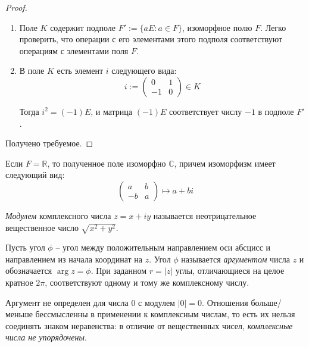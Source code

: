 \begin{proof}
\begin{enumerate}
    		\item Поле $K$ содержит подполе $F' := \{aE: a \in F\}$, изоморфное полю $F$. Легко проверить, что операции с его элементами этого подполя соответствуют операциям с элементами поля $F$.
    		
    		\item В поле $K$ есть элемент $i$ следующего вида:
    		\[i := \begin{pmatrix}
    		0 & 1\\
    		-1 & 0
    		\end{pmatrix} \in K\]
    		
    		Тогда $i^2 = (-1)E$, и матрица $(-1)E$ соответствует числу $-1$ в подполе $F'$.
    	\end{enumerate}
    	
    	Получено требуемое.
    \end{proof}
    
    \begin{corollary}
    	Если $F = \mathbb{R}$, то полученное поле изоморфно $\mathbb{C}$, причем изоморфизм имеет следующий вид:
    	\[\begin{pmatrix}
    	a & b\\
    	-b & a
    	\end{pmatrix} \mapsto a +bi\]
    \end{corollary}

    \begin{definition}
        \textit{Модулем} комплексного числа $z = x + iy$ называется неотрицательное вещественное число $\sqrt{x^2 + y^2}$.
    \end{definition}

    \begin{definition}
        Пусть угол $\phi$ -- угол между положительным направлением оси абсцисс и направлением из начала координат на $z$. Угол $\phi$ называется \textit{аргументом} числа $z$ и обозначается $\arg z = \phi$. При заданном $r = |z|$ углы, отличающиеся на целое кратное $2\pi$, соответствуют одному и тому же комплексному числу.
    \end{definition}

    \begin{note}
        Аргумент не определен для числа $0$ с модулем $|0| = 0$.
        Отношения больше/меньше бессмысленны в применении к комплексным числам, то есть их нельзя соединять знаком неравенства: в отличие от вещественных чисел, \textit{комплексные числа не упорядочены}.
    \end{note}